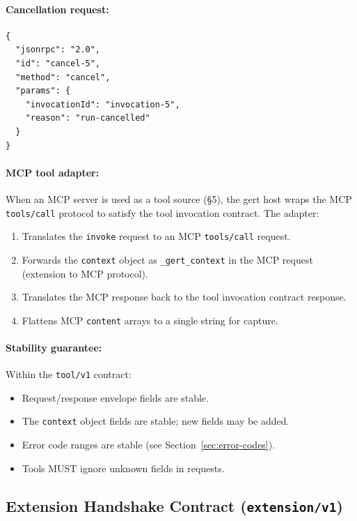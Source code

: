 \paragraph{Cancellation request:}

\begin{verbatim}
{
  "jsonrpc": "2.0",
  "id": "cancel-5",
  "method": "cancel",
  "params": {
    "invocationId": "invocation-5",
    "reason": "run-cancelled"
  }
}
\end{verbatim}

\paragraph{MCP tool adapter:}

When an MCP server is used as a tool source (§5), the gert host wraps the MCP
\texttt{tools/call} protocol to satisfy the tool invocation contract.  The
adapter:

\begin{enumerate}
  \item Translates the \texttt{invoke} request to an MCP \texttt{tools/call}
        request.
  \item Forwards the \texttt{context} object as \texttt{\_gert\_context} in the
        MCP request (extension to MCP protocol).
  \item Translates the MCP response back to the tool invocation contract
        response.
  \item Flattens MCP \texttt{content} arrays to a single string for capture.
\end{enumerate}

\paragraph{Stability guarantee:}

Within the \texttt{tool/v1} contract:

\begin{itemize}
  \item Request/response envelope fields are stable.
  \item The \texttt{context} object fields are stable; new fields may be added.
  \item Error code ranges are stable (see Section~\ref{sec:error-codes}).
  \item Tools MUST ignore unknown fields in requests.
\end{itemize}

\subsection{Extension Handshake Contract (\texttt{extension/v1})}
\label{sec:extension-handshake-contract}

